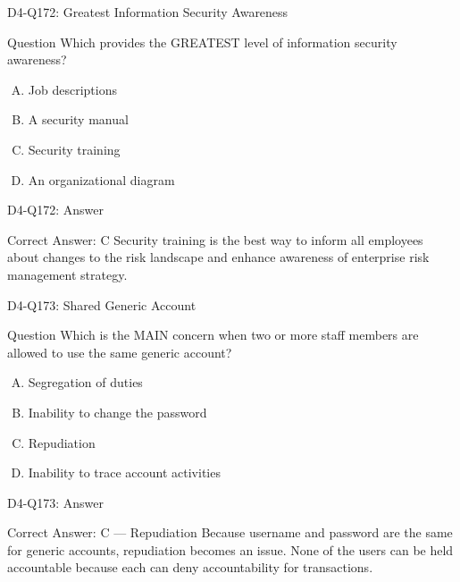 \documentclass{beamer}
\begin{document}
	\begin{frame}{D4-Q172: Greatest Information Security Awareness}
		\begin{block}{Question}
			Which provides the GREATEST level of information security awareness?
		\end{block}
		\begin{enumerate}[(A)]
			\item Job descriptions
			\item A security manual
			\item Security training
			\item An organizational diagram
		\end{enumerate}
	\end{frame}
	\begin{frame}{D4-Q172: Answer}
		\begin{block}{Correct Answer: C}
			Security training is the best way to inform all employees about changes to the risk landscape and enhance awareness of enterprise risk management strategy.
		\end{block}
	\end{frame}
	
	\begin{frame}{D4-Q173: Shared Generic Account}
		\begin{block}{Question}
			Which is the MAIN concern when two or more staff members are allowed to use the same generic account?
		\end{block}
		\begin{enumerate}[(A)]
			\item Segregation of duties
			\item Inability to change the password
			\item Repudiation
			\item Inability to trace account activities
		\end{enumerate}
	\end{frame}
	\begin{frame}{D4-Q173: Answer}
		\begin{block}{Correct Answer: C --- Repudiation}
			Because username and password are the same for generic accounts, repudiation becomes an issue. None of the users can be held accountable because each can deny accountability for transactions.
		\end{block}
	\end{frame}
	
\end{document}

